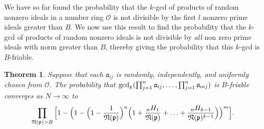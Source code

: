 \documentclass[12pt]{amsart}
\newtheorem{theorem}{Theorem}[subsection]
\theoremstyle{definition}
\newcommand{\f}[1]{\mathfrak{#1}}
\begin{document}
We have so far found the probability that the $k$-gcd of products of random nonzero ideals in a number ring $\mathcal{O}$ is not divisible by the first \(l\) nonzero prime ideals greater than \(B\). We now use this result to find the probability that the $k$-gcd of products of random nonzero ideals is not divisible by \textit{all} non zero prime ideals with norm greater than $B$, thereby giving the probability that this $k$-gcd is $B$-friable.

\begin{theorem}
Suppose that each $\f{a}_{ij}$ is randomly, independently, and uniformly chosen from $\mathcal{O}$. The probability that $\gcd_k(\prod_{j=1}^{n}\f{a}_{ij},\mathellipsis,\prod_{j=1}^{n}\f{a}_{mj})$ is $B$-friable converges as $N\to\infty$ to $$\prod_{\f{N}(\f{p})>B} \Big[1 - \Big(1 -\Big(1-\frac{1}{\f{N}(\f{p})}\Big)^n\Big(1+\frac{{}_nH_1}{\f{N}(\f{p})}+\mathellipsis+\frac{{}_nH_{k-1}}{\f{N}(\f{p})^{k-1}}\Big)\Big)^m\Big].$$
\end{theorem}
\end{document}

